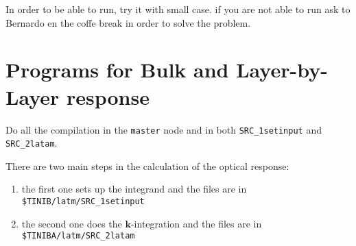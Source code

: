 In order to be able to run, try it with small case. 
if you are not able to run ask to Bernardo en the coffe 
break in order to solve the problem. 

\section{Programs for Bulk and Layer-by-Layer response}
\label{sec:programs}

Do all the compilation in the \verb=master= node and in both 
\verb=SRC_1setinput=
and
\verb=SRC_2latam=.

There are two main steps in the calculation of the optical response:

\begin{enumerate}

\item the first one sets up the integrand and the
files are in\\
\verb=$TINIB/latm/SRC_1setinput=
\item the second one does the $\mathbf{k}$-integration and the files
  are in\\
\verb=$TINIBA/latm/SRC_2latam=
\end{enumerate}

